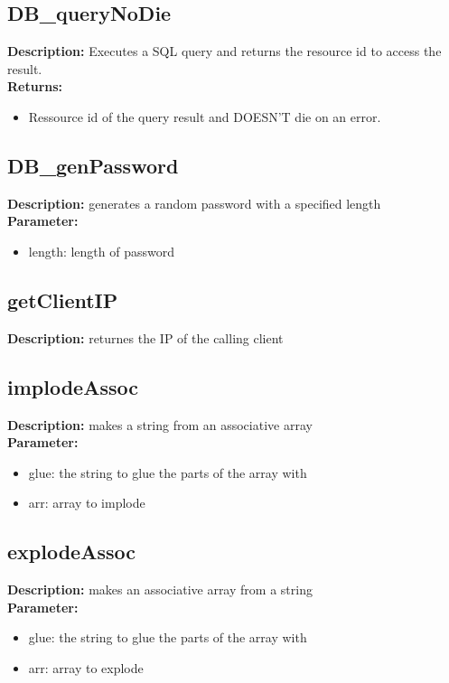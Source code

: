 \subsection{DB\_queryNoDie}
\textbf{Description:} Executes a SQL query and returns the resource id to access the result.\\
\textbf{Returns:}
\begin{itemize}
\item Ressource id of the query result and DOESN'T die on an error.
\end{itemize}

\subsection{DB\_genPassword}
\textbf{Description:} generates a random password with a specified length\\
\textbf{Parameter:}
\begin{itemize}
\item length: length of password
\end{itemize}

\subsection{getClientIP}
\textbf{Description:} returnes the IP of the calling client\\

\subsection{implodeAssoc}
\textbf{Description:} makes a string from an associative array\\
\textbf{Parameter:}
\begin{itemize}
\item glue: the string to glue the parts of the array with
\item arr: array to implode
\end{itemize}

\subsection{explodeAssoc}
\textbf{Description:} makes an associative array from a string\\
\textbf{Parameter:}
\begin{itemize}
\item glue: the string to glue the parts of the array with
\item arr: array to explode
\end{itemize}


